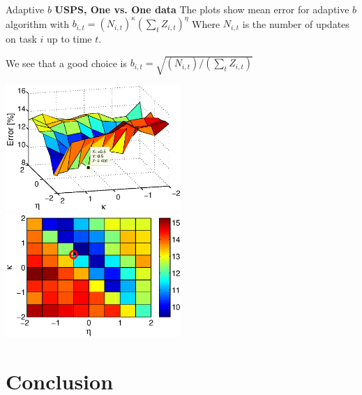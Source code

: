 \documentclass{beamer}
\begin{document}
%
%

\begin{frame}{Adaptive $b$}
\textbf{USPS, One vs. One data} \newline
The plots show mean error for adaptive $b$ algorithm with $b_{i,t}= (N_{i,t})^{\kappa}(\sum_t{Z_{i,t}})^{\eta}$\newline
Where $N_{i,t}$ is the number of updates on task $i$ up to time $t$.\newline

We see that a good choice is  $b_{i,t}=\sqrt{(N_{i,t})/(\sum_t{Z_{i,t}})}$\newline

\begin{centering}
\includegraphics[width=0.5\textwidth]{figs/Mean_test_error_adaptive_b_V2_3D.eps}
\includegraphics[width=0.5\textwidth]{figs/Mean_test_error_adaptive_b_V2_2D.eps}
\end{centering}
\end{frame}

\section{Conclusion}
\end{document}
